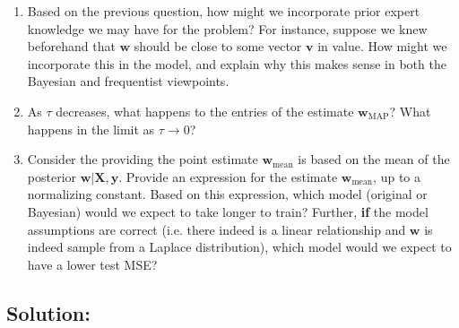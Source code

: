 \documentclass[submit]{harvardml}
\begin{document}
\begin{problem}
\begin{enumerate}
        \item Based on the previous question, how might we incorporate prior expert knowledge we may have for the problem? For instance, suppose we knew beforehand that $\mathbf{w}$ should be close to some vector $\mathbf{v}$ in value. How might we incorporate this in the model, and explain why this makes sense in both the Bayesian and frequentist viewpoints.
        
        \item As $\tau$ decreases, what happens to the entries of the estimate $\mathbf{w}_{\mathrm{MAP}}$? What happens in the limit as $\tau \to 0$?
        
        \item Consider the providing the point estimate $\mathbf{w}_{\mathrm{mean}}$ is based on the mean of the posterior $\mathbf{w}|\mathbf{X},\mathbf{y}$. Provide an expression for the estimate $\mathbf{w}_{\mathrm{mean}}$, up to a normalizing constant. Based on this expression, which model (original or Bayesian) would we expect to take longer to train? Further, \textbf{if} the model assumptions are correct (i.e. there indeed is a linear relationship and $\mathbf{w}$ is indeed sample from a Laplace distribution), which model would we expect to have a lower test MSE?
        
    \end{enumerate}
  
  
\end{problem}

\subsection*{Solution:}


\newpage
\end{document}
